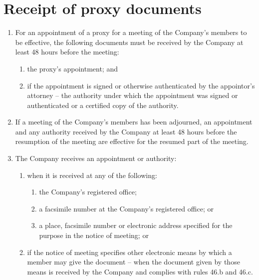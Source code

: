 \section{Receipt of proxy documents}

\begin{enumerate}[label=(\alph*)]
    \item For an appointment of a proxy for a meeting of the Company's members to be effective, the following documents must be received by the Company at least 48 hours before the meeting:
    \begin{enumerate}[label=(\roman*)]
        \item the proxy's appointment; and
        \item if the appointment is signed or otherwise authenticated by the appointor's attorney – the authority under which the appointment was signed or authenticated or a certified copy of the authority.
    \end{enumerate}
    
    \item If a meeting of the Company's members has been adjourned, an appointment and any authority received by the Company at least 48 hours before the resumption of the meeting are effective for the resumed part of the meeting.
    
    \item The Company receives an appointment or authority:
    \begin{enumerate}[label=(\roman*)]
        \item when it is received at any of the following:
        \begin{enumerate}[label=(\alph*)]
            \item the Company's registered office;
            \item a facsimile number at the Company's registered office; or
            \item a place, facsimile number or electronic address specified for the purpose in the notice of meeting; or
        \end{enumerate}
        \item if the notice of meeting specifies other electronic means by which a member may give the document – when the document given by those means is received by the Company and complies with rules 46.b and 46.c.
    \end{enumerate}
    

\end{enumerate}
